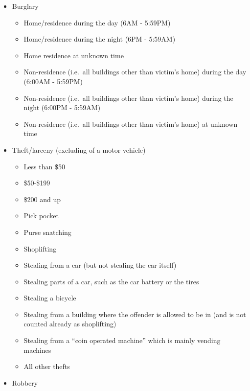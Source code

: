 \documentclass[
]{krantz}
\providecommand{\tightlist}{%
  \setlength{\itemsep}{0pt}\setlength{\parskip}{0pt}}
\begin{document}
\begin{itemize}
\tightlist
\item
  Burglary

  \begin{itemize}
  \tightlist
  \item
    Home/residence during the day (6AM - 5:59PM)
  \item
    Home/residence during the night (6PM - 5:59AM)
  \item
    Home residence at unknown time
  \item
    Non-residence (i.e.~all buildings other than victim's
    home) during the day (6:00AM - 5:59PM)
  \item
    Non-residence (i.e.~all buildings other than victim's
    home) during the night (6:00PM - 5:59AM)
  \item
    Non-residence (i.e.~all buildings other than victim's
    home) at unknown time
  \end{itemize}
\item
  Theft/larceny (excluding of a motor vehicle)

  \begin{itemize}
  \tightlist
  \item
    Less than \$50
  \item
    \$50-\$199
  \item
    \$200 and up
  \item
    Pick pocket
  \item
    Purse snatching
  \item
    Shoplifting
  \item
    Stealing from a car (but not stealing the car itself)
  \item
    Stealing parts of a car, such as the car battery or the
    tires
  \item
    Stealing a bicycle
  \item
    Stealing from a building where the offender is allowed
    to be in (and is not counted already as shoplifting)
  \item
    Stealing from a ``coin operated machine'' which is
    mainly vending machines
  \item
    All other thefts
  \end{itemize}
\item
  Robbery


\end{itemize}
\end{document}
